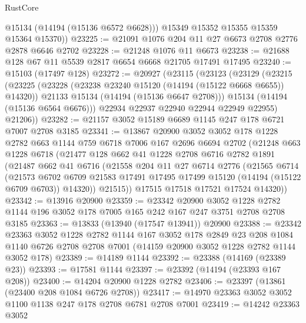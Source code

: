 \begin{lexlean}{RustCore}
\begin{coremodule}
          @15134
          (@14194 (@15136 @6572 @6628)))
        @15349
        @15352
        @15355
        @15359
        @15364
        @15370))
@23225 := @21091 @1076 @204 @11 @27 @6673 @2708 @2776 @2878 @6646 @2702
@23228 := @21248 @1076 @11 @6673
@23238 := @21688 @128 @67 @11 @5539 @2817 @6654 @6668 @21705 @17491 @17495
@23240 := @15103 (@17497 @128)
@23272 := @20927
    (@23115
      (@23123
        (@23129
          (@23215
            (@23225
              (@23228 (@23238 @23240 @15120 (@14194 (@15122 @6668 @6655)) @14320))
              @21133
              @15134
              (@14194 (@15136 @6647 @2708)))
            @15134
            (@14194 (@15136 @6564 @6676)))
          @22934
          @22937
          @22940
          @22944
          @22949
          @22955)
        @21206))
@23282 := @21157 @3052 @15189 @6689 @1145 @247 @178 @6721 @7007 @2708 @3185
@23341 := @13867
    @20900
    @3052
    @3052
    @178
    @1228
    @2782
    @663
    @1144
    @759
    @6718
    @7006
    @167
    @2696
    @6694
    @2702
    (@21248
      @663
      @1228
      @6718
      (@21477
        @128
        @662
        @41
        @1228
        @2708
        @6716
        @2782
        @1891
        (@21487
          @662
          @41
          @6716
          (@21558
            @204
            @11
            @27
            @6714
            @2776
            (@21565
              @6714
              (@21573
                @6702
                @6709
                @21583
                @17491
                @17495
                @17499
                @15120
                (@14194 (@15122 @6709 @6703))
                @14320))
            @21515))
        @17515
        @17518
        @17521
        @17524
        @14320))
@23342 := @13916 @20900
@23359 := @23342
    @20900
    @3052
    @1228
    @2782
    @1144
    @196
    @3052
    @178
    @7005
    @165
    @242
    @167
    @247
    @3751
    @2708
    @2708
    @3185
@23363 := @13833 (@13940 (@17547 @13941)) @20900
@23388 := @23342
    @23363
    @3052
    @1228
    @2782
    @1144
    @167
    @3052
    @178
    @2849
    @23
    @208
    @1084
    @1140
    @6726
    @2708
    @2708
    @7001
    (@14159 @20900 @3052 @1228 @2782 @1144 @3052 @178)
@23389 := @14189 @1144
@23392 := @23388 (@14169 (@23389 @23))
@23393 := @17581 @1144
@23397 := @23392 (@14194 (@23393 @167 @208))
@23400 := @14204 @20900 @1228 @2782
@23406 := @23397 (@13861 (@23400 @208 @1084 @6726 @2708))
@23417 := @14970 @23363 @3052 @3052 @1100 @1138 @247 @178 @2708 @6781 @2708 @7001
@23419 := @14242 @23363 @3052

\end{coremodule}
\end{lexlean}
